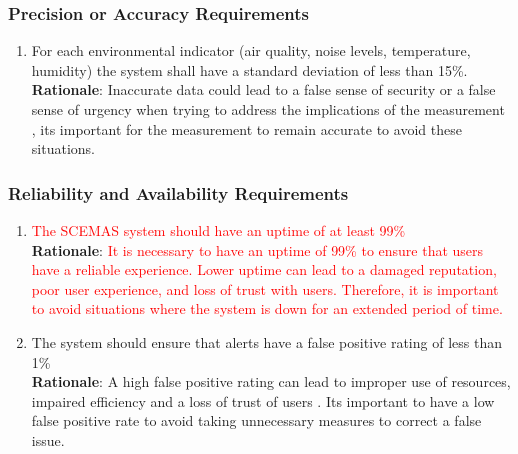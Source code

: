 \documentclass[]{article}
\begin{document}
\subsubsection{Precision or Accuracy Requirements}
\label{ssub:precision_or_accuracy_requirements}
\begin{enumerate}[{PR-PA}1. ]
	\item For each environmental indicator (air quality, noise levels, temperature, humidity) the system shall have a standard deviation of less than 15\%.\\
    \textbf{Rationale}: Inaccurate data could lead to a false sense of security or a false sense of urgency when trying to address the implications of the measurement \cite{envmon}, its important for the measurement to remain accurate to avoid these situations.
\end{enumerate}

\subsubsection{Reliability and Availability Requirements}
\label{ssub:reliability_and_availability_requirements}
\begin{enumerate}[{PR-RA}1. ]
	\item \textcolor{red}{The SCEMAS system should have an uptime of at least 99\%}\\
    \textbf{Rationale}: \textcolor{red}{It is necessary to have an uptime of 99\% to ensure that users have a reliable experience. Lower uptime can lead to a damaged reputation, poor user experience, and loss of trust with users. Therefore, it is important to avoid situations where the system is down for an extended period of time. {\cite{PRRA1a}} {\cite{PRRA1b}}}
    \item The system should ensure that alerts have a false positive rating of less than 1\%\\
    \textbf{Rationale}: A high false positive rating can lead to improper use of resources, impaired efficiency and a loss of trust of users \cite{vwo}. Its important to have a low false positive rate to avoid taking unnecessary measures to correct a false issue.
\end{enumerate}
\end{document}
